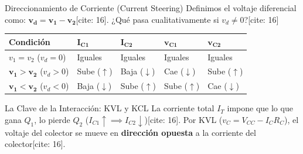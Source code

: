 \documentclass[aspectratio=169]{beamer}
\begin{document}
\begin{frame}{Direccionamiento de Corriente (Current Steering)}
    Definimos el voltaje diferencial como: $\mathbf{v_d = v_1 - v_2}$[cite: 16]. ¿Qué pasa cualitativamente si $v_d \neq 0$?[cite: 16]
    
    \begin{table}
        \centering
        \small
        \renewcommand{\arraystretch}{1.2}
        \begin{tabularx}{0.95\textwidth}{|>{\raggedright\arraybackslash}p{2.5cm}|>{\centering\arraybackslash}X|>{\centering\arraybackslash}X|>{\centering\arraybackslash}X|>{\centering\arraybackslash}X|}
        \hline
        \rowcolor{ucbblue!20}
        \textbf{Condición} & $\mathbf{I_{C1}}$ & $\mathbf{I_{C2}}$ & $\mathbf{v_{C1}}$ & $\mathbf{v_{C2}}$ \\ \hline
        $v_1 = v_2$ ($v_d = 0$) & Iguales & Iguales & Iguales & Iguales \\ \hline
        $\mathbf{v_1 > v_2}$ ($v_d > 0$) & Sube ($\uparrow$) & Baja ($\downarrow$) & Cae ($\downarrow$) & Sube ($\uparrow$) \\ \hline
        $\mathbf{v_1 < v_2}$ ($v_d < 0$) & Baja ($\downarrow$) & Sube ($\uparrow$) & Sube ($\uparrow$) & Cae ($\downarrow$) \\ \hline
        \end{tabularx}
    \end{table}
    
    \begin{alertblock}{La Clave de la Interacción: KVL y KCL}
        La corriente total $I_T$ impone que lo que gana $Q_1$, lo pierde $Q_2$ ($I_{C1} \uparrow \implies I_{C2} \downarrow$)[cite: 16]. Por KVL ($v_C = V_{CC} - I_C R_C$), el voltaje del colector se mueve en \textbf{dirección opuesta} a la corriente del colector[cite: 16].
    \end{alertblock}
\end{frame}
\end{document}
